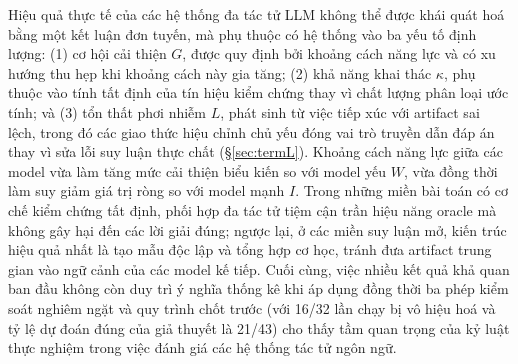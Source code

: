 \documentclass[11pt,a4paper]{article}
\begin{document}
Hiệu quả thực tế của các hệ thống đa tác tử LLM không thể được khái quát hoá bằng một kết luận
đơn tuyến, mà phụ thuộc có hệ thống vào ba yếu tố định lượng: (1) cơ hội cải thiện $G$, được
quy định bởi khoảng cách năng lực và có xu hướng thu hẹp khi khoảng cách này gia tăng; (2) khả năng
khai thác $\kappa$, phụ thuộc vào tính tất định của tín hiệu kiểm chứng thay vì chất lượng phân
loại ước tính; và (3) tổn thất phơi nhiễm $L$, phát sinh từ việc tiếp xúc với artifact sai lệch,
trong đó các giao thức hiệu chỉnh chủ yếu đóng vai trò truyền dẫn đáp án thay vì sửa lỗi suy luận
thực chất (\S\ref{sec:termL}). Khoảng cách năng lực giữa các model vừa làm tăng mức cải thiện
biểu kiến so với model yếu $W$, vừa đồng thời làm suy giảm giá trị ròng so với model mạnh $I$. Trong
những miền bài toán có cơ chế kiểm chứng tất định, phối hợp đa tác tử tiệm cận trần hiệu năng
oracle mà không gây hại đến các lời giải đúng; ngược lại, ở các miền suy luận mở, kiến trúc
hiệu quả nhất là tạo mẫu độc lập và tổng hợp cơ học, tránh đưa artifact trung gian vào ngữ cảnh
của các model kế tiếp. Cuối cùng, việc nhiều kết quả khả quan ban đầu không còn duy trì ý nghĩa
thống kê khi áp dụng đồng thời ba phép kiểm soát nghiêm ngặt và quy trình chốt trước (với 16/32
lần chạy bị vô hiệu hoá và tỷ lệ dự đoán đúng của giả thuyết là 21/43) cho thấy tầm quan trọng của
kỷ luật thực nghiệm trong việc đánh giá các hệ thống tác tử ngôn ngữ.
\end{document}
